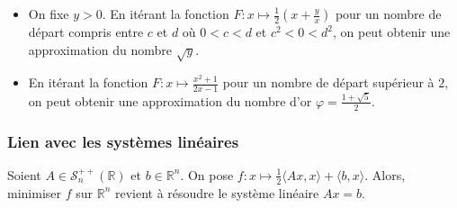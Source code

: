 	\begin{example}
		\begin{itemize}
			\item On fixe $y > 0$. En itérant la fonction $F : x \mapsto \frac{1}{2} \left( x + \frac{y}{x} \right)$ pour un nombre de départ compris entre $c$ et $d$ où $0 < c < d$ et $c^2 < 0 < d^2$, on peut obtenir une approximation du nombre $\sqrt{y}$.
			\item En itérant la fonction $F : x \mapsto \frac{x^2+1}{2x-1}$ pour un nombre de départ supérieur à $2$, on peut obtenir une approximation du nombre d'or $\varphi = \frac{1+\sqrt{5}}{2}$.
		\end{itemize}
	\end{example}

	\subsubsection{Lien avec les systèmes linéaires}


	\begin{proposition}
		Soient $A \in \mathcal{S}_n^{++}(\mathbb{R})$ et $b \in \mathbb{R}^n$. On pose $f : x \mapsto \frac{1}{2} \langle Ax, x \rangle + \langle b, x \rangle$. Alors, minimiser $f$ sur $\mathbb{R}^n$ revient à résoudre le système linéaire $Ax=b$.
	\end{proposition}


